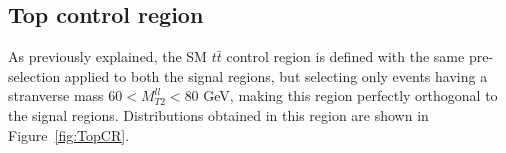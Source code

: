 \documentclass[a4paper, 10pt, openright]{report}
\begin{document}
\subsection{Top control region} \label{section:TopCR}

As previously explained, the \ac{SM} $t \bar t$ control region is defined with the same pre-selection applied to both the signal regions, but selecting only events having a stranverse mass $60 < M_{T2}^{ll} < 80$ GeV, making this region perfectly orthogonal to the signal regions. Distributions obtained in this region are shown in Figure~\ref{fig:TopCR}.

\begin{figure}[htbp]
\centering
{}
\end{figure}
\end{document}
